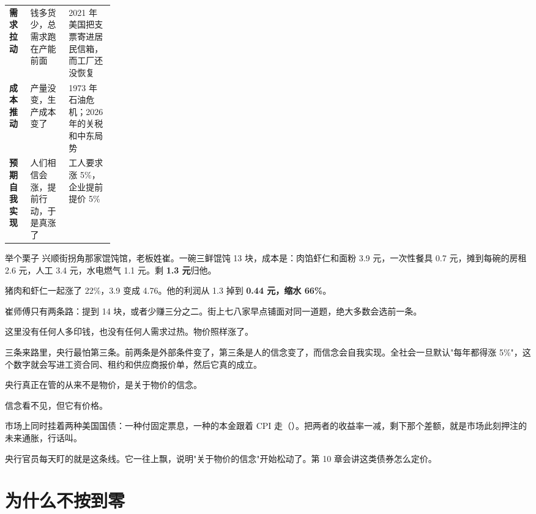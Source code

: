 \begin{tablewrap}
\begin{xltabular}{\linewidth}{>{\raggedright\arraybackslash}p{0.20\linewidth}XX}
\toprule
{} &  &  \\
\midrule
\textbf{需求拉动} & 钱多货少，总需求跑在产能前面 & 2021 年美国把支票寄进居民信箱，而工厂还没恢复 \\
\textbf{成本推动} & 产量没变，生产成本变了 & 1973 年石油危机；2026 年的关税和中东局势 \\
\textbf{预期自我实现} & 人们相信会涨，提前行动，于是真涨了 & 工人要求涨 5\%，企业提前提价 5\% \\
\bottomrule
\end{xltabular}
\end{tablewrap}

\begin{egbox}{举个栗子}
兴顺街拐角那家馄饨馆，老板姓崔。一碗三鲜馄饨 13 块，成本是：肉馅虾仁和面粉 3.9 元，一次性餐具 0.7 元，摊到每碗的房租 2.6 元，人工 3.4 元，水电燃气 1.1 元。剩 \textbf{1.3 元}归他。

猪肉和虾仁一起涨了 22\%，3.9 变成 4.76。他的利润从 1.3 掉到 \textbf{0.44 元，缩水 66\%}。

崔师傅只有两条路：提到 14 块，或者少赚三分之二。街上七八家早点铺面对同一道题，绝大多数会选前一条。

这里没有任何人多印钱，也没有任何人需求过热。物价照样涨了。

\end{egbox}

三条来路里，央行最怕第三条。前两条是外部条件变了，第三条是人的信念变了，而信念会自我实现。全社会一旦默认"每年都得涨 5\%"，这个数字就会写进工资合同、租约和供应商报价单，然后它真的成立。

央行真正在管的从来不是物价，是关于物价的信念。

信念看不见，但它有价格。

市场上同时挂着两种美国国债：一种付固定票息，一种的本金跟着 CPI 走（）。把两者的收益率一减，剩下那个差额，就是市场此刻押注的未来通胀，行话叫。

央行官员每天盯的就是这条线。它一往上飘，说明"关于物价的信念"开始松动了。第 10 章会讲这类债券怎么定价。

\section{为什么不按到零}

